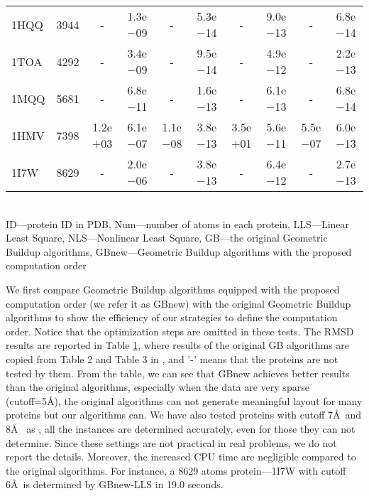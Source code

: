 \documentclass[a4paper,12pt]{article}
\begin{document}
\begin{table}[htb!]
{\begin{tabular}{lrcccccccc}
  1HQQ & 3944 &     -     & 1.3e$-$09 &     -     & 5.3e$-$14 &     -     & 9.0e$-$13 &     -    & 6.8e$-$14  \\
  1TOA & 4292 &     -     & 3.4e$-$09 &     -     & 9.5e$-$14 &     -     & 4.9e$-$12 &     -    & 2.2e$-$13  \\
  1MQQ & 5681 &     -     & 6.8e$-$11 &     -     & 1.6e$-$13 &     -     & 6.1e$-$13 &     -    & 6.8e$-$14  \\
  1HMV & 7398 & 1.2e$+$03 & 6.1e$-$07 & 1.1e$-$08 & 3.8e$-$13 & 3.5e$+$01 & 5.6e$-$11 & 5.5e$-$07& 6.0e$-$13  \\
  1I7W & 8629 &     -     & 2.0e$-$06 &     -     & 3.8e$-$13 &     -     & 6.4e$-$12 &     -    & 2.7e$-$13  \\ \toprule
\end{tabular}\\[-4mm]
\label{table:exact}
\bl ID---protein ID in PDB, Num---number of atoms in each protein, LLS---Linear Least Square, NLS---Nonlinear Least Square, GB---the original Geometric Buildup algorithms, GBnew---Geometric Buildup algorithms with the proposed computation order \el
}
\end{table}

We first compare Geometric Buildup algorithms equipped with the proposed computation order (we refer it as GBnew) with the original Geometric Buildup algorithms to show the efficiency of our strategies to define the computation order. Notice that the optimization steps are omitted in these tests. The RMSD results are reported in Table \ref{table:exact}, where results of the original GB algorithms are copied from Table 2 and Table 3 in \cite{Sit2009}, and '-' means that the proteins are not tested by them. From the table, we can see that GBnew achieves better results than the original algorithms, especially when the data are very sparse (cutoff=5\AA), the original algorithms can not generate meaningful layout for many proteins but our algorithms can. We have also tested proteins with cutoff 7\AA ~and 8\AA~ as \cite{Sit2009}, all the instances are determined accurately, even for those they can not determine. Since these settings are not practical in real problems, we do not report the details. Moreover, the increased CPU time are negligible compared to the original algorithms. For instance, a 8629 atoms protein---1I7W with cutoff 6\AA ~is determined by GBnew-LLS in 19.0 seconds.
\end{document}
